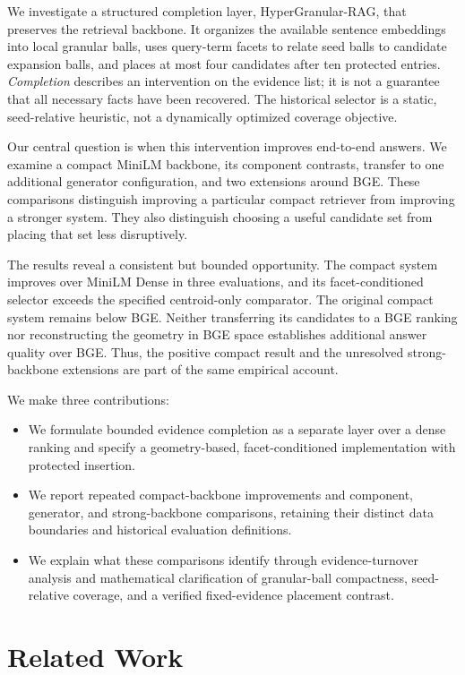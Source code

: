 \documentclass[11pt]{article}
\newcommand{\hgrag}{HyperGranular-RAG\xspace}
\begin{document}
We investigate a structured completion layer, \hgrag, that preserves the
retrieval backbone. It organizes the available sentence embeddings into local
granular balls, uses query-term facets to relate seed balls to candidate
expansion balls, and places at most four candidates after ten protected
entries. \emph{Completion} describes an intervention on the evidence list; it is
not a guarantee that all necessary facts have been recovered. The historical
selector is a static, seed-relative heuristic, not a dynamically optimized
coverage objective.

Our central question is when this intervention improves end-to-end answers.
We examine a compact MiniLM backbone, its component contrasts, transfer to one
additional generator configuration, and two extensions around BGE. These
comparisons distinguish improving a particular compact retriever from
improving a stronger system. They also distinguish choosing a useful candidate
set from placing that set less disruptively.

The results reveal a consistent but bounded opportunity. The compact system
improves over MiniLM Dense in three evaluations, and its facet-conditioned
selector exceeds the specified centroid-only comparator. The original compact
system remains below BGE. Neither transferring its candidates to a BGE
ranking nor reconstructing the geometry in BGE space establishes additional
answer quality over BGE. Thus, the positive compact result and the unresolved
strong-backbone extensions are part of the same empirical account.

We make three contributions:
\begin{itemize}
\item We formulate bounded evidence completion as a separate layer over a
dense ranking and specify a geometry-based, facet-conditioned implementation
with protected insertion.
\item We report repeated compact-backbone improvements and component,
generator, and strong-backbone comparisons, retaining their distinct data
boundaries and historical evaluation definitions.
\item We explain what these comparisons identify through evidence-turnover
analysis and mathematical clarification of granular-ball compactness,
seed-relative coverage, and a verified fixed-evidence placement contrast.
\end{itemize}

\section{Related Work}
\end{document}
